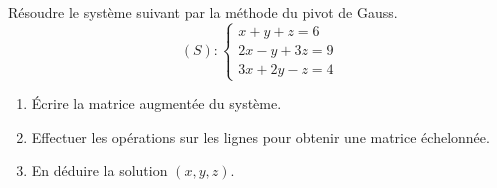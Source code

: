 \documentclass[11pt]{article}
\begin{document}
\begin{exercice}
Résoudre le système suivant par la méthode du pivot de Gauss.
\[
(S) : \begin{cases}
x + y + z = 6 \\
2x - y + 3z = 9 \\
3x + 2y - z = 4
\end{cases}
\]
\begin{enumerate}
    \item Écrire la matrice augmentée du système.
    \item Effectuer les opérations sur les lignes pour obtenir une matrice échelonnée.
    \item En déduire la solution $(x,y,z)$.
\end{enumerate}
\end{exercice}
\end{document}

